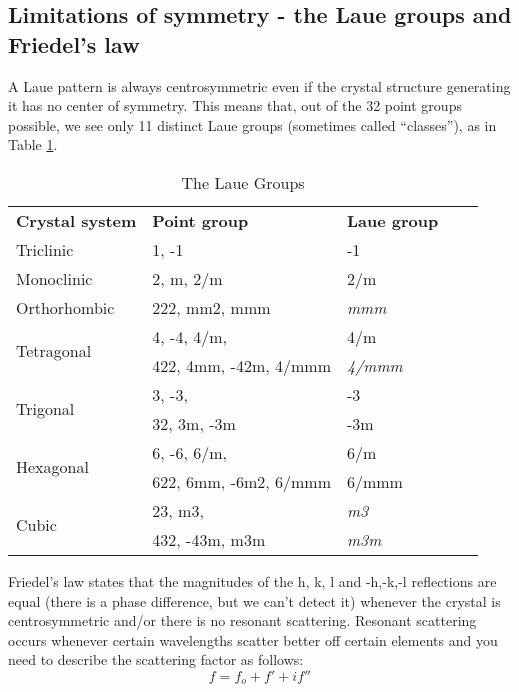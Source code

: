 \subsection{Limitations of symmetry - the Laue groups and Friedel’s law}
A Laue pattern is always centrosymmetric even if the crystal structure generating it has no center of symmetry. This means that, out of the 32 point groups possible, we see only 11 distinct Laue groups (sometimes called “classes”), as in Table \ref{LaueGroups}.
\begin{table}[]
\caption{The Laue Groups}
\begin{tabular}{lllll}
\textbf{Crystal   system}   & \textbf{Point group}  & \textbf{Laue group} &  &  \\
Triclinic                   & 1, -1                 & -1                  &  &  \\
Monoclinic                  & 2, m, 2/m             & 2/m                 &  &  \\
Orthorhombic                & 222, mm2, mmm         & \textit{mmm}        &  &  \\
\multirow{2}{*}{Tetragonal} & 4, -4, 4/m,           & 4/m                 &  &  \\
                            & 422, 4mm, -42m, 4/mmm & \textit{4/mmm}      &  &  \\
\multirow{2}{*}{Trigonal}   & 3, -3,                & -3                  &  &  \\
                            & 32, 3m, -3m           & -3m                 &  &  \\
\multirow{2}{*}{Hexagonal}  & 6, -6, 6/m,           & 6/m                 &  &  \\
                            & 622, 6mm, -6m2, 6/mmm & 6/mmm               &  &  \\
\multirow{2}{*}{Cubic}      & 23, m3,               & \textit{m3}         &  &  \\
                            & 432, -43m, m3m        & \textit{m3m}        &  & 
\end{tabular}
\label{LaueGroups}
\end{table}
Friedel's law states that the magnitudes of the h, k, l and -h,-k,-l reflections are equal (there is a phase difference, but we can’t detect it) whenever the crystal is centrosymmetric and/or there is no resonant scattering. Resonant scattering occurs whenever certain wavelengths scatter better off certain elements and you need to describe the scattering factor as follows:
\begin{equation}
    f=f_o+f'+if''
    \label{Friedel'sLaw}
\end{equation}
